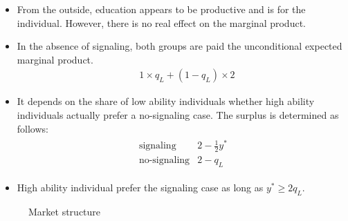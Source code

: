 \begin{frame}
\begin{itemize}\setlength\itemsep{1em}
\item From the outside, education appears to be productive and is for the individual. However, there is no real effect on the marginal product.
\end{itemize}
\end{frame}
\begin{frame}
\begin{itemize}\setlength\itemsep{1em}
\item In the absence of signaling, both groups are paid the unconditional expected marginal product.
	\begin{align*}
	   & 1\times q_L + (1 - q_L) \times 2
	\end{align*}
\end{itemize}
\end{frame}
\begin{frame}
\begin{itemize}\setlength\itemsep{1em}
\item It depends on the share of low ability individuals whether high ability individuals actually prefer a no-signaling case. The surplus is determined as follows:
	\begin{align*}\begin{array}{ll}
	\text{signaling}    & 2 - \tfrac{1}{2} y^* \\
	\text{no-signaling} & 2 - q_L
	\end{array}\end{align*}
\item High ability individual prefer the signaling case as long as $y^* \geq 2 q_L$.
\end{itemize}



\end{frame}
\begin{frame}\begin{figure}[htp]\centering
\caption{Market structure}
\end{figure}\end{frame}
